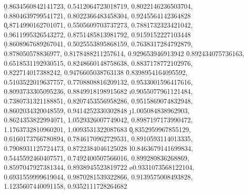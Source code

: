 \readlist*{} %
\readlist*\b{0.8634560842141723, 0.5412064723018719, 0.8022146236503704, 0.8804639799541721, 0.8022366483458304, 0.9245564142364828} %
\readlist*\c{0.8714990162701071, 0.5505609703737273, 0.7881732323421042, 0.9611995326543272, 0.8751485813981792, 0.9159152227103448} %
\readlist*\d{0.8608967689267041, 0.5025553895868159, 0.7638317284792879, 0.878050578836977, 0.8178488211257614, 0.929653946913942} %
\readlist*{} %
\readlist*\f{0.892434075736163, 0.6518531192930515, 0.8248660148758638, 0.8837178772102976, 0.822714017388242, 0.9476605038763138} %
\readlist*{} %
\readlist*\h{0.8398954164095592, 0.5103522019637757, 0.7708808816209132, 0.9533001596417616, 0.8093733305095236, 0.8849918198915682} %
\readlist*\i{0.9055077961121484, 0.7380731321188851, 0.8207453556958286, 0.9515869074832948, 0.8602034320048559, 0.9414252330302848} %
\readlist*\j{1.005084838962903, 0.8624353822994071, 1.0529326007749042, 0.8987197173990472, 1.1763732810960201, 1.0093531322087683} %
\readlist*\k{0.8352959967855129, 0.6160173766780894, 0.7846170962729531, 0.8910593114013335, 0.7908931125724473, 0.8722384046125028} %
\readlist*\l{0.8463679141699834, 0.5445592460407571, 0.7492400507566016, 0.899280836268869, 0.8597047927381344, 0.8938945523819722} %
\readlist*{} %
\readlist*{} %
\readlist*\o{0.9331073568122104, 0.6931559999619044, 0.9870281539322866, 0.9139575008493828, 1.1235607440091158, 0.9352111728264682} %


\readlist*{} 
\readlist*{} 
\readlist*{}

